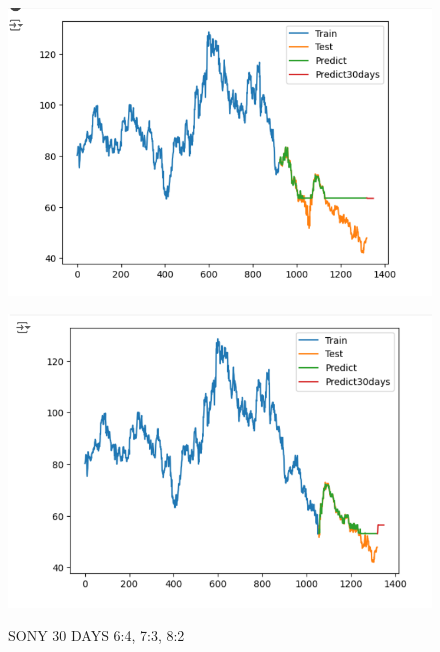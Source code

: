 \documentclass{article}
\begin{document}
\begin{multicols}{2}
\begin{figure}[H]
\begin{minipage}{0.15\textwidth}
    \label{fig:1}
    \end{minipage}%
    \begin{minipage}{0.15\textwidth}
    \centering
    \includegraphics[width=1\textwidth]{Image/GradientBoosting/SONY_30_7_3_GradientBoostingRegressor.png}
  
    \label{fig:2}
    \end{minipage}%
    \begin{minipage}{0.15\textwidth}
    \centering
    \includegraphics[width=1\textwidth]{Image/GradientBoosting/SONY_30_8_2_GradientBoostingRegressor.png}

    \label{fig:3}
    \end{minipage}
    \caption{SONY 30 DAYS  6:4, 7:3, 8:2 }
\end{figure}


\end{multicols}
\end{document}
